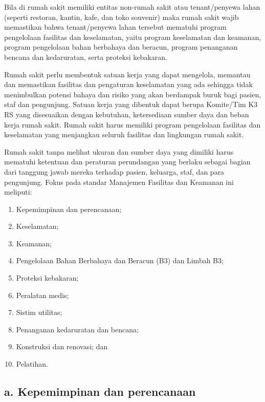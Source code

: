 \documentclass[
]{book}
\providecommand{\tightlist}{%
  \setlength{\itemsep}{0pt}\setlength{\parskip}{0pt}}
\begin{document}
Bila di rumah sakit memiliki entitas non-rumah sakit atau tenant/penyewa lahan (seperti restoran, kantin, kafe, dan toko souvenir) maka rumah sakit wajib memastikan bahwa tenant/penyewa lahan tersebut mematuhi program pengelolaan fasilitas dan keselamatan, yaitu program keselamatan dan keamanan, program pengelolaan bahan berbahaya dan beracun, program penanganan bencana dan kedaruratan, serta proteksi kebakaran.

Rumah sakit perlu membentuk satuan kerja yang dapat mengelola, memantau dan memastikan fasilitas dan pengaturan keselamatan yang ada sehingga tidak menimbulkan potensi bahaya dan risiko yang akan berdampak buruk bagi pasien, staf dan pengunjung. Satuan kerja yang dibentuk dapat berupa Komite/Tim K3 RS yang disesuaikan dengan kebutuhan, ketersediaan sumber daya dan beban kerja rumah sakit. Rumah sakit harus memiliki program pengelolaan fasilitas dan keselamatan yang menjangkau seluruh fasilitas dan lingkungan rumah sakit.

Rumah sakit tanpa melihat ukuran dan sumber daya yang dimiliki harus mematuhi ketentuan dan peraturan perundangan yang berlaku sebagai bagian dari tanggung jawab mereka terhadap pasien, keluarga, staf, dan para pengunjung.
Fokus pada standar Manajemen Fasilitas dan Keamanan ini meliputi:

\begin{enumerate}
\def\labelenumi{\alph{enumi}.}
\tightlist
\item
  Kepemimpinan dan perencanaan;
\item
  Keselamatan;
\item
  Keamanan;
\item
  Pengelolaan Bahan Berbahaya dan Beracun (B3) dan Limbah B3;
\item
  Proteksi kebakaran;
\item
  Peralatan medis;
\item
  Sistim utilitas;
\item
  Penanganan kedaruratan dan bencana;
\item
  Konstruksi dan renovasi; dan
\item
  Pelatihan.
\end{enumerate}

\hypertarget{a.-kepemimpinan-dan-perencanaan}{%
\subsection*{a. Kepemimpinan dan perencanaan}\label{a.-kepemimpinan-dan-perencanaan}}
\end{document}

